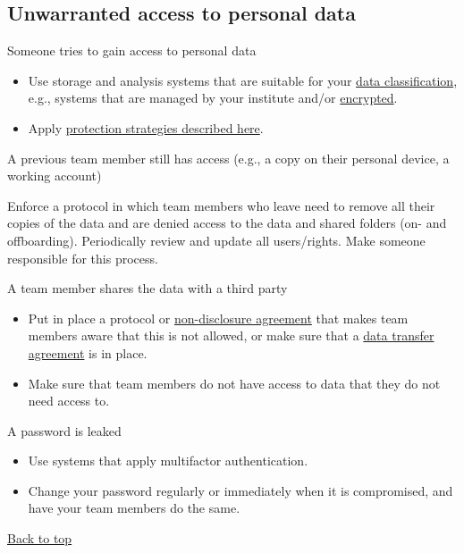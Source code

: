 \documentclass[
]{book}
\providecommand{\tightlist}{%
  \setlength{\itemsep}{0pt}\setlength{\parskip}{0pt}}
\begin{document}
\hypertarget{unwarranted-access}{%
\subsection{Unwarranted access to personal data}\label{unwarranted-access}}

Someone tries to gain access to personal data

\begin{itemize}
\tightlist
\item
  Use storage and analysis systems that are suitable for your
  \protect\hyperlink{data-classification}{data classification}, e.g., systems that are managed by
  your institute and/or \protect\hyperlink{encryption}{encrypted}.
\item
  Apply \protect\hyperlink{data-oriented-strategies}{protection strategies described here}.
\end{itemize}

A previous team member still has access (e.g., a copy on their
personal device, a working account)

Enforce a protocol in which team members who leave need to remove all their
copies of the data and are denied access to the data and shared folders (on- and
offboarding). Periodically review and update all users/rights. Make someone
responsible for this process.

A team member shares the data with a third party

\begin{itemize}
\tightlist
\item
  Put in place a protocol or \protect\hyperlink{nda}{non-disclosure agreement} that makes team
  members aware that this is not allowed, or make sure that a
  \protect\hyperlink{data-transfer-agreement}{data transfer agreement} is in place.
\item
  Make sure that team members do not have access to data that they do not
  need access to.
\end{itemize}

A password is leaked

\begin{itemize}
\tightlist
\item
  Use systems that apply multifactor authentication.
\item
  Change your password regularly or immediately when it is compromised, and
  have your team members do the same.
\end{itemize}

\protect\hyperlink{example-risks}{Back to top}
\end{document}
